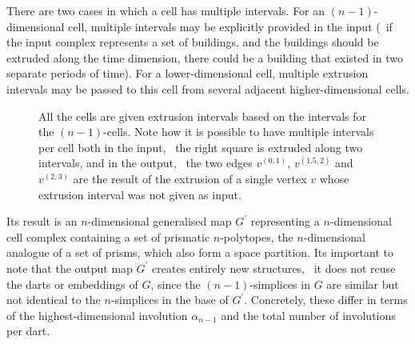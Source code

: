 There are two cases in which a cell has multiple intervals.
For an $(n-1)$-dimensional cell, multiple intervals may be explicitly provided in the input (\eg\ if the input complex represents a set of buildings, and the buildings should be extruded along the time dimension, there could be a building that existed in two separate periods of time).
For a lower-dimensional cell, multiple extrusion intervals may be passed to this cell from several adjacent higher-dimensional cells.
\begin{figure}[tbp]
\centering
{}
{}
\caption[The extrusion intervals of the lower-dimensional cells]{All the cells are given extrusion intervals based on the intervals for the $(n-1)$-cells.
Note how it is possible to have multiple intervals per cell both in the input, \eg\ the right square is extruded along two intervals, and in the output, \eg\ the two edges $v^{(0,1)}$, $v^{(1.5,2)}$ and $v^{(2,3)}$ are the result of the extrusion of a single vertex $v$ whose extrusion interval was not given as input.}
\label{fig:extrusion-intervals}
\end{figure}
Its result is an $n$-dimensional generalised map $G^{\prime}$ representing a $n$-dimensional cell complex containing a set of prismatic $n$-polytopes, the $n$-dimensional analogue of a set of prisms, which also form a space partition.
Its important to note that the output map $G^\prime$ creates entirely new structures, \ie\ it does not reuse the darts or embeddings of $G$, since the $(n-1)$-simplices in $G$ are similar but not identical to the $n$-simplices in the base of $G^\prime$.
Concretely, these differ in terms of the highest-dimensional involution $\alpha_{n-1}$ and the total number of involutions per dart.

